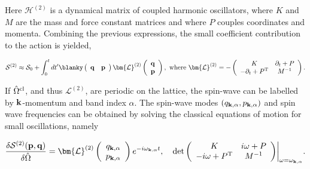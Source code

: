 Here $\bm{\mathcal{H}}^{(2)}$ is a dynamical matrix of coupled harmonic oscillators, where $K$ and $M$ are the mass and force constant matrices and where $P$ couples coordinates and momenta. Combining the previous expressions, the small coefficient contribution to the action is yielded,

\begin{equation}
    \mathcal{S}^{(2)} \approx \mathcal{S}_0 + \int_{0}^t dt' \blanky \left(\begin{array}{cc}
          {\bf q} & {\bf p}
    \end{array}\right) \bm{\mathcal{L}}^{(2)} \left( \begin{array}{c}
          {\bf q} \\
          {\bf p}
    \end{array}\right), \textnormal{ where } \bm{\mathcal{L}}^{(2)} = - \left(\begin{array}{cc}
        K & \partial_{t} + P \\
        - \partial_{t} + P^{\textnormal{T}} & M^{-1} 
    \end{array}\right).
\end{equation}

If $\hat{\Omega}^{\textnormal{cl}}$, and thus $\bm{\mathcal{L}}^{(2)}$, are periodic on the lattice, the spin-wave can be labelled by ${\bf k}$-momentum and band index $\alpha$. 
The spin-wave modes $(q_{{\bf k}, \alpha}, p_{{\bf k}, \alpha})$ and spin wave frequencies can be obtained by solving the classical equations of motion for small oscillations, namely 

\begin{equation}
\begin{split}
     \frac{\delta \mathcal{S}^{(2)} ({\bf p}, {\bf q})}{\delta \hat{\Omega}} = \bm{\mathcal{L}}^{(2)}  \left(\begin{array}{c}
         q_{{\bf k}, \alpha}  \\
         p_{{\bf k}, \alpha} 
    \end{array}\right) e^{-i \omega_{{\bf k}, \alpha} t}, \quad 
    \det \bigg(\begin{array}{cc}
        K & i\omega + P  \\
        -i\omega + P^{\textnormal{T}} & M^{-1} 
    \end{array}\bigg)\bigg|_{\omega = \omega_{{\bf k}, \alpha}}.
\end{split}
\label{spin_wave_path_int_small_osc_approx}
\end{equation}

